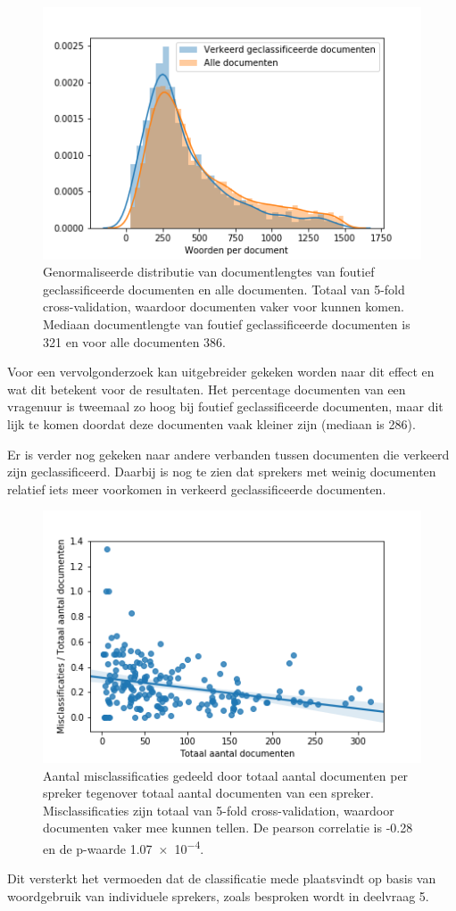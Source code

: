 \begin{figure}[H]
  \centering
    \includegraphics[width=0.40\paperwidth]{Verslag/Tables/misclassifiedlengths.png}
\caption{Genormaliseerde distributie van documentlengtes van foutief geclassificeerde documenten en alle documenten. Totaal van 5-fold cross-validation, waardoor documenten vaker voor kunnen komen. Mediaan documentlengte van foutief geclassificeerde documenten is 321 en voor alle documenten 386.}
\label{fig:misclassified}
\end{figure}
Voor een vervolgonderzoek kan uitgebreider gekeken worden naar dit effect en wat dit betekent voor de resultaten. Het percentage documenten van een vragenuur is tweemaal zo hoog bij foutief geclassificeerde documenten, maar dit lijk te komen doordat deze documenten vaak kleiner zijn (mediaan is 286).\par
Er is verder nog gekeken naar andere verbanden tussen documenten die verkeerd zijn geclassificeerd. Daarbij is nog te zien dat sprekers met weinig documenten relatief iets meer voorkomen in verkeerd geclassificeerde documenten.
\begin{figure}[H]
  \centering
    \includegraphics[width=0.40\paperwidth]{Verslag/Tables/misclassifiedsprekers.png}
\caption{Aantal misclassificaties gedeeld door totaal aantal documenten per spreker tegenover totaal aantal documenten van een spreker. Misclassificaties zijn totaal van 5-fold cross-validation, waardoor documenten vaker mee kunnen tellen. De pearson correlatie is -0.28 en de p-waarde \num{1.07e-4}.}
\label{fig:misclassifiedsprekers}
\end{figure}
Dit versterkt het vermoeden dat de classificatie mede plaatsvindt op basis van woordgebruik van individuele sprekers, zoals besproken wordt in deelvraag 5.\par


